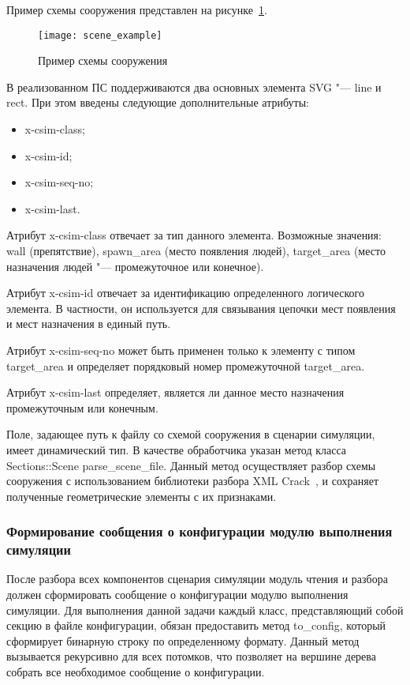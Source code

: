 Пример схемы сооружения представлен на рисунке~\ref{sec:development:preprocessor:svg_scheme_listing}.

\begin{figure}[!ht]
  \centering
  \texttt{[image: scene\_example]}
  \caption{Пример схемы сооружения}
  \label{sec:development:preprocessor:svg_scheme_listing}
\end{figure}

В реализованном ПС поддерживаются два основных элемента SVG "--- line и rect.
При этом введены следующие дополнительные атрибуты:
\begin{itemize}
  \item x-csim-class;
  \item x-csim-id;
  \item x-csim-seq-no;
  \item x-csim-last.
\end{itemize}

Атрибут x-csim-class отвечает за тип данного элемента.
Возможные значения:
  wall (препятствие),
  spawn\_area (место появления людей),
  target\_area (место назначения людей "--- промежуточное или конечное).

Атрибут x-csim-id отвечает за идентификацию определенного логического элемента.
В частности, он используется для связывания цепочки мест появления и мест назначения в единый путь.

Атрибут x-csim-seq-no может быть применен только к элементу с типом target\_area и определяет порядковый номер промежуточной target\_area.

Атрибут x-csim-last определяет, является ли данное место назначения промежуточным или конечным.

Поле, задающее путь к файлу со схемой сооружения в сценарии симуляции, имеет динамический тип.
В качестве обработчика указан метод класса Sections::Scene parse\_scene\_file.
Данный метод осуществляет разбор схемы сооружения с использованием библиотеки разбора XML Crack~\cite{ruby_crack_gem}, и сохраняет полученные геометрические элементы с их признаками.

\subsubsection{Формирование сообщения о конфигурации модулю выполнения симуляции}
\label{sec:development:preprocessor:format}

После разбора всех компонентов сценария симуляции модуль чтения и разбора должен сформировать сообщение о конфигурации модулю выполнения симуляции.
Для выполнения данной задачи каждый класс, представляющий собой секцию в файле конфигурации, обязан предоставить метод to\_config, который сформирует бинарную строку по определенному формату.
Данный метод вызывается рекурсивно для всех потомков, что позволяет на вершине дерева собрать все необходимое сообщение о конфигурации.


